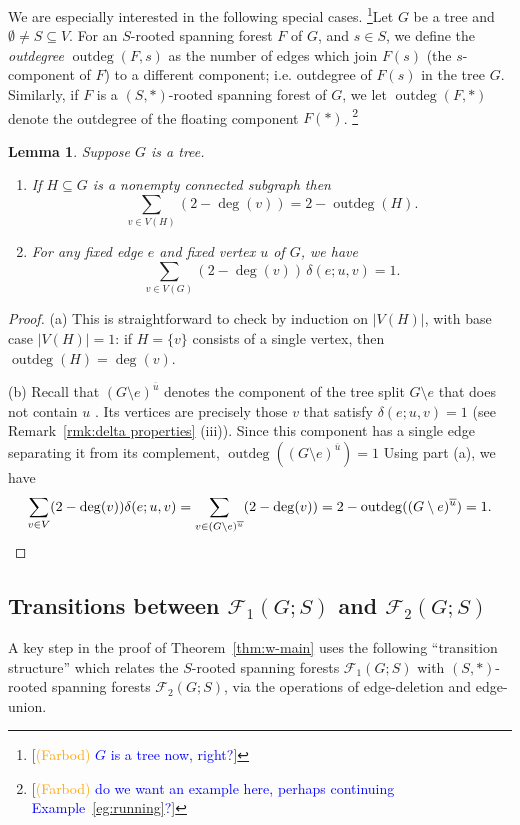 \documentclass[12pt]{amsart}
\newtheorem{lem}[thm]{Lemma}
\theoremstyle{definition}
\newcommand{\trees}{\mathcal{F}_1}
\newcommand{\forests}{\mathcal{F}}
\DeclareMathOperator{\outdeg}{outdeg}
\newcommand\farbod[1]{\footnote{[\textcolor{orange}{(Farbod)} \textcolor{blue}{#1}]}}
\begin{document}
We are especially interested in the following special cases. \farbod{$G$ is a tree now, right?}Let $G$ be a tree and $\emptyset \ne S \subseteq V$. 
For an $S$-rooted spanning forest $F$ of $G$, and $s \in S$, we define the {\em outdegree} $\outdeg(F,s)$ as the number of edges which join $F(s)$ (the $s$-component of $F$) to a different component; i.e. outdegree of $F(s)$ in the tree $G$. 
Similarly, if $F$ is a $(S,*)$-rooted spanning forest of $G$, we let $\outdeg(F,*)$ denote the outdegree of the floating component $F(*)$.
\farbod{do we want an example here, perhaps continuing Example~\ref{eg:running}?}
\begin{lem}
\label{lem:outdeg-sum}
Suppose $G$ is a tree.
\begin{enumerate}[label=(\alph*)]
\item 
If $H \subseteq G$ is a nonempty connected subgraph then
\[
	\sum_{v \in V(H)} \left( 2 -  \deg(v) \right) = 2 - \outdeg(H) .
\]
\item 
For any fixed edge $e$ and fixed vertex $u$ of $G$, we have
\[
	\sum_{v \in V(G)} (2 - \deg(v))\, \delta(e; u,v) = 1.
\]
\end{enumerate}
\end{lem}
\begin{proof}
(a)
This is straightforward to check by induction on $|V(H)|$,
with base case $|V(H)| = 1$:
if $H = \{v\}$ consists of a single vertex, then $\outdeg(H) = \deg(v)$.


(b)
Recall that $(G \setminus e)^{\overline u}$ denotes the component of the tree split $G \setminus e$ that does not contain $u$ .
Its vertices are precisely those $v$ that satisfy $\delta(e; u, v) = 1$ (see Remark~\ref{rmk:delta properties} (iii)).
Since this component has a single edge separating it from its complement, 
$\outdeg((G \setminus e)^{\overline u}) = 1$
Using part (a), we have
\[
	\sum_{v \in V} (2 - \deg(v)) \delta(e; u,v)
	= \sum_{v \in (G \setminus e)^{\overline u}} (2 - \deg(v))
	= 2 - \outdeg((G \setminus e)^{\overline u}) = 1. 
	\qedhere
\] 
\end{proof}


\subsection{Transitions between $\trees(G; S)$ and $\forests_2(G; S)$}
A key step in the proof of Theorem~\ref{thm:w-main} uses the following ``transition structure'' which relates the $S$-rooted spanning forests $\trees(G; S)$ with $(S, *)$-rooted spanning forests $\forests_2(G; S)$,
via the operations of edge-deletion and edge-union.
\end{document}
